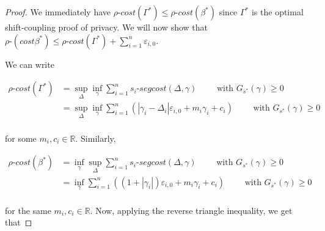 \documentclass{article}
\newcommand{\R}{\mathbb{R}}
\renewcommand{\epsilon}{\varepsilon}
\newcommand{\1}{\langle 1 \rangle}
\newcommand{\2}{\langle 2 \rangle}
\begin{document}
\begin{proof}
    We immediately have $\rho\text{-}cost(\Gamma^*) \leq \rho\text{-}cost(\beta^*)$ since $\Gamma^*$ is the optimal shift-coupling proof of privacy. We will now show that $\rho\text{-}(cost\beta^*) \leq \rho\text{-}cost(\Gamma^*) + \sum_{i = 1}^n \epsilon_{i, 0}$.

    We can write 

    \begin{align*}
        \rho\text{-}cost(\Gamma^*) &= \sup_{\Delta} \inf_{\gamma} \sum_{i = 1}^n s_i\text{-}segcost(\Delta, \gamma) \qquad \text{ with } G_{s^*}(\gamma) \geq 0\\
        &= \sup_{\Delta} \inf_{\gamma} \sum_{i = 1}^n \left(|\gamma_i - \Delta_i| \epsilon_{i, 0} + m_i \gamma_i + c_i\right) \qquad \text{ with } G_{s^*}(\gamma) \geq 0\\
    \end{align*}

    for some $m_i, c_i \in \R$. Similarly, 

    \begin{align*}
        \rho\text{-}cost(\beta^*) &= \inf_{\gamma} \sup_{\Delta} \sum_{i = 1}^n s_i\text{-}segcost(\Delta, \gamma) \qquad \text{ with } G_{s^*}(\gamma) \geq 0\\
        &= \inf_{\gamma} \sum_{i = 1}^n \left((1 + |\gamma_i|) \epsilon_{i, 0} + m_i \gamma_i + c_i\right) \qquad \text{ with } G_{s^*}(\gamma) \geq 0\\
    \end{align*}

    for the same $m_i, c_i \in \R$. Now, applying the reverse triangle inequality, we get that


\end{proof}
\end{document}
